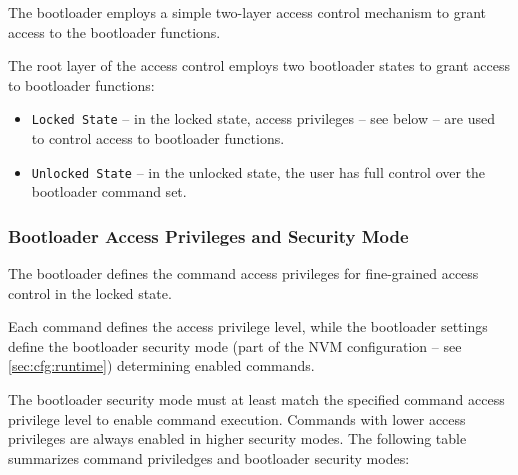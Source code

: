 The bootloader employs a simple two-layer access control mechanism to grant access to the bootloader functions.

The root layer of the access control employs two bootloader states to grant access to bootloader functions:

\begin{itemize}
  \item \texttt{Locked State} -- in the locked state, access privileges -- see  below -- are used to control access to bootloader functions.
  \item \texttt{Unlocked State} -- in the unlocked state, the user has full control over the bootloader command set.
\end{itemize}

\subsubsection*{Bootloader Access Privileges and Security Mode} \label{sec:arch:secModes}

The bootloader defines the command access privileges for fine-grained access control in the locked state. 

Each command defines the access privilege level, while the bootloader settings define the bootloader security mode
(part of the NVM configuration -- see \ref{sec:cfg:runtime}) determining enabled commands. 

The bootloader security mode must at least match the specified command access privilege level to enable command execution.
Commands with lower access privileges are always enabled in higher security modes.
The following table summarizes command priviledges and bootloader security modes:

